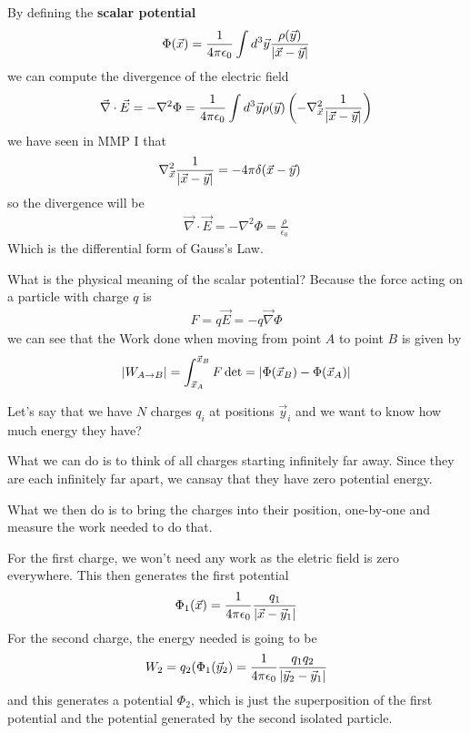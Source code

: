 By defining the \textbf{scalar potential}
\begin{align*}
  \Phi(\vec{x}) =\frac{1}{4 \pi \epsilon_0} \int d^{3} \vec{y} \frac{\rho(\vec{y})}{\vert\vec{x} - \vec{y}\vert}
\end{align*}
we can compute the divergence of the electric field
\begin{align*}
  \vec{\nabla} \cdot \vec{E} = - \nabla^{2} \Phi = \frac{1}{4 \pi \epsilon_0} \int d^{3} \vec{y} \rho(\vec{y}) \left(
    - \nabla_{\vec{x}}^{2} \frac{1}{\vert\vec{x} - \vec{y}\vert}
  \right)
\end{align*}
we have seen in MMP I that
\begin{align*}
  \nabla_{\vec{x}}^{2} \frac{1}{\vert\vec{x}- \vec{y}\vert} &= - 4 \pi \delta(\vec{x}- \vec{y})
\end{align*}
so the divergence will be 
\begin{align*}
  \vec{\nabla} \cdot \vec{E} = - \nabla^{2} \Phi = \frac{\rho}{\epsilon_0}
\end{align*}
Which is the differential form of Gauss's Law.


What is the physical meaning of the scalar potential?
Because the force acting on a particle with charge $q$ is
\begin{align*}
  F = q \vec{E} = - q \vec{\nabla}\Phi
\end{align*}
we can see that the Work done when moving from point $A$ to point $B$ is given by
\begin{align*}
  \vert W_{A \to  B}\vert = \int_{\vec{x}_A}^{\vec{x}_B} F \det = \vert\Phi(\vec{x}_B) - \Phi(\vec{x}_A)\vert
\end{align*}

Let's say that we have $N$ charges $q_i$ at positions $\vec{y}_i$ and we want to know how much energy they have?

What we can do is to think of all charges starting infinitely far away. Since they are each infinitely far apart, we cansay that they have zero potential energy.

What we then do is to bring the charges into their position, one-by-one and measure the work needed to do that.

For the first charge, we won't need any work as the eletric field is zero everywhere. 
This then generates the first potential
\begin{align*}
  \Phi_1(\vec{x}) = \frac{1}{4 \pi \epsilon_0} \frac{q_1}{\vert\vec{x} - \vec{y}_1\vert}
\end{align*}
For the second charge, the energy needed is going to be
\begin{align*}
  W_2 = q_2 (\Phi_1(\vec{y}_2) = \frac{1}{4 \pi \epsilon_0} \frac{q_1 q_2}{\vert\vec{y}_2 - \vec{y}_1\vert}
\end{align*}
and this generates a potential $\Phi_2$, which is just the superposition of the first potential and the potential generated by the second isolated particle.

